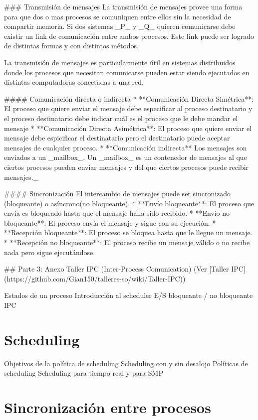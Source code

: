 ### Transmisión de mensajes
La transmisión de mensajes provee una forma para que dos o mas procesos se comuniquen entre ellos sin la necesidad de compartir memoria. Si dos sistemas _P_ y _Q_
quieren comunicarse debe existir un link de comunicación entre ambos procesos. Este link puede ser logrado de distintas formas y con distintos métodos.

La transmisión de mensajes es particularmente útil en sistemas distribuidos donde los procesos que necesitan comunicarse pueden estar siendo ejecutados en distintas computadoras conectadas a una red.

#### Comunicación directa o indirecta
*  **Comunicación Directa Simétrica**: El proceso que quiere enviar el mensaje debe especificar al proceso destinatario y el proceso destinatario debe indicar cuál es el proceso que le debe mandar el mensaje
*  **Comunicación Directa Asimétrica**: El proceso que quiere enviar el mensaje debe espicificar el destinatario pero el destinatario puede aceptar mensajes de cualquier proceso.
* **Comunicación indirecta**
Los mensajes son enviados a un _mailbox_. Un _mailbox_ es un contenedor de mensajes al que ciertos procesos pueden enviar mensajes y del que ciertos procesos puede recibir mensajes._

#### Sincronización
El intercambio de mensajes puede ser sincronizado (bloqueante) o asíncrono(no bloqueante). 
* **Envío bloqueante**: El proceso que envía es bloqueado hasta que el mensaje halla sido recibido.
* **Envío no bloqueante**: El proceso envía el mensaje y sigue con su ejecución.
* **Recepción bloqueante**: El proceso se bloquea hasta que le llegue un mensaje.
* **Recepción no bloqueante**: El proceso recibe un mensaje válido o no recibe nada pero sigue ejecutándose.

## Parte 3: Anexo Taller IPC (Inter-Process Comunication)
(Ver [Taller IPC](https://github.com/Gian150/talleres-so/wiki/Taller-IPC))


Estados de un proceso
Introducción al scheduler
E/S bloqueante / no bloqueante
IPC

\section{Scheduling}

Objetivos de la política de scheduling
Scheduling con y sin desalojo
Políticas de scheduling
Scheduling para tiempo real y para SMP

\section{Sincronización entre procesos}

